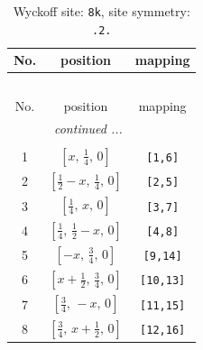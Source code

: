 \documentclass[fleqn,8pt]{jsarticle}
\begin{document}
\begin{longtable}{ccc}
\caption{Wyckoff site: {\tt 8k}, site symmetry: {\tt .2.}}
 \\
 \hline \hline
No. & position & mapping \\ \hline \endfirsthead

\multicolumn{2}{l}{\tablename\ \thetable{}} \\
 \hline \hline
No. & position & mapping \\ \hline \endhead

 \hline \hline
\multicolumn{2}{r}{\footnotesize\it continued ...} \\ \endfoot

 \hline \hline
\multicolumn{2}{r}{} \\ \endlastfoot

1 & $\left[ x,\, \frac{1}{4},\, 0 \right]$ & {\tt [1,6]} \\ \hline
2 & $\left[ \frac{1}{2} - x,\, \frac{1}{4},\, 0 \right]$ & {\tt [2,5]} \\ \hline
3 & $\left[ \frac{1}{4},\, x,\, 0 \right]$ & {\tt [3,7]} \\ \hline
4 & $\left[ \frac{1}{4},\, \frac{1}{2} - x,\, 0 \right]$ & {\tt [4,8]} \\ \hline
5 & $\left[ - x,\, \frac{3}{4},\, 0 \right]$ & {\tt [9,14]} \\ \hline
6 & $\left[ x + \frac{1}{2},\, \frac{3}{4},\, 0 \right]$ & {\tt [10,13]} \\ \hline
7 & $\left[ \frac{3}{4},\, - x,\, 0 \right]$ & {\tt [11,15]} \\ \hline
8 & $\left[ \frac{3}{4},\, x + \frac{1}{2},\, 0 \right]$ & {\tt [12,16]} \\
\end{longtable}
\renewcommand{\arraystretch}{1.2}
\end{document}
